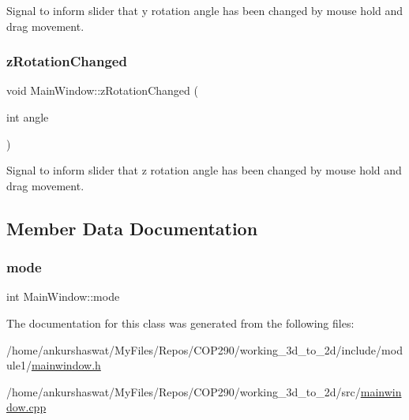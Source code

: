 Signal to inform slider that y rotation angle has been changed by mouse hold and drag movement. 

\mbox{\label{classMainWindow_a08d6c28ab348ab6626abf0168e73cd1d}} 
\subsubsection{\texorpdfstring{z\+Rotation\+Changed}{zRotationChanged}}
{\footnotesize\ttfamily void Main\+Window\+::z\+Rotation\+Changed (\begin{DoxyParamCaption}\item[{int}]{angle }\end{DoxyParamCaption})\hspace{0.3cm}{\ttfamily [signal]}}



Signal to inform slider that z rotation angle has been changed by mouse hold and drag movement. 



\subsection{Member Data Documentation}
\mbox{\label{classMainWindow_a0d680234c97ecdc151020dd0ec09cc54}} 
\subsubsection{\texorpdfstring{mode}{mode}}
{\footnotesize\ttfamily int Main\+Window\+::mode}



The documentation for this class was generated from the following files\+:\begin{DoxyCompactItemize}
\item 
/home/ankurshaswat/\+My\+Files/\+Repos/\+C\+O\+P290/working\+\_\+3d\+\_\+to\+\_\+2d/include/module1/\hyperlink{mainwindow_8h}{mainwindow.\+h}\item 
/home/ankurshaswat/\+My\+Files/\+Repos/\+C\+O\+P290/working\+\_\+3d\+\_\+to\+\_\+2d/src/\hyperlink{mainwindow_8cpp}{mainwindow.\+cpp}\end{DoxyCompactItemize}
